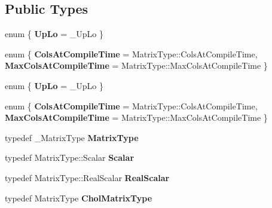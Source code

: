 \subsection*{Public Types}
\begin{DoxyCompactItemize}
\item 
\mbox{\label{class_eigen_1_1_cholmod_base_a54e3db5df104e66b86d6f392a185aa40}} 
enum \{ {\bfseries Up\+Lo} = \+\_\+\+Up\+Lo
 \}
\item 
\mbox{\label{class_eigen_1_1_cholmod_base_a092f1d2634e843c03dd677e156f1be79}} 
enum \{ {\bfseries Cols\+At\+Compile\+Time} = Matrix\+Type\+:\+:Cols\+At\+Compile\+Time, 
{\bfseries Max\+Cols\+At\+Compile\+Time} = Matrix\+Type\+:\+:Max\+Cols\+At\+Compile\+Time
 \}
\item 
\mbox{\label{class_eigen_1_1_cholmod_base_a9727d36fa5e9f1ec72232d38734127b7}} 
enum \{ {\bfseries Up\+Lo} = \+\_\+\+Up\+Lo
 \}
\item 
\mbox{\label{class_eigen_1_1_cholmod_base_afbc4cf0f8db015e560a6ca4154b392d0}} 
enum \{ {\bfseries Cols\+At\+Compile\+Time} = Matrix\+Type\+:\+:Cols\+At\+Compile\+Time, 
{\bfseries Max\+Cols\+At\+Compile\+Time} = Matrix\+Type\+:\+:Max\+Cols\+At\+Compile\+Time
 \}
\item 
\mbox{\label{class_eigen_1_1_cholmod_base_afe78a31a015c2044984b8db916694af3}} 
typedef \+\_\+\+Matrix\+Type {\bfseries Matrix\+Type}
\item 
\mbox{\label{class_eigen_1_1_cholmod_base_ad6a5c19a8dda800ca460fc8dfc0fca08}} 
typedef Matrix\+Type\+::\+Scalar {\bfseries Scalar}
\item 
\mbox{\label{class_eigen_1_1_cholmod_base_a71ebe5db761957c82e451118f7ff7d63}} 
typedef Matrix\+Type\+::\+Real\+Scalar {\bfseries Real\+Scalar}
\item 
\mbox{\label{class_eigen_1_1_cholmod_base_a82a0f525caf126ef100aa602bb2b90ef}} 
typedef Matrix\+Type {\bfseries Chol\+Matrix\+Type}
\item 

\end{DoxyCompactItemize}
